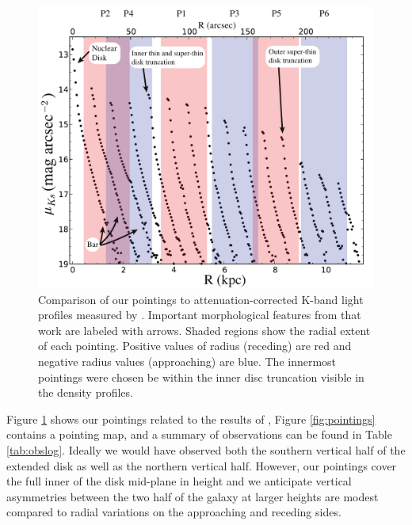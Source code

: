 \begin{figure}
  \centering
  \includegraphics[width=0.8\columnwidth]{891_1/figs/ASR_pointings.pdf}
  \caption[\GP pointings compared to known features in NGC
  891]{\label{fig:ASR_comp}\fixspacing Comparison of our \GP pointings
    to attenuation-corrected K-band light profiles measured by
    \citet{Schechtman-Rook13}. Important morphological features from
    that work are labeled with arrows. Shaded regions show the radial
    extent of each \GP pointing. Positive values of radius (receding)
    are red and negative radius values (approaching) are blue. The
    innermost \GP pointings were chosen be within the inner disc
    truncation visible in the density profiles.}
\end{figure}

Figure \ref{fig:ASR_comp} shows our \GP pointings related to the
results of \citet{Schechtman-Rook13}, Figure \ref{fig:pointings}
contains a pointing map, and a summary of observations can be found in
Table \ref{tab:obslog}. Ideally we would have observed both the
southern vertical half of the extended disk as well as the northern
vertical half. However, our pointings cover the full inner
 of the disk mid-plane in height and we anticipate
vertical asymmetries between the two half of the galaxy at larger
heights are modest compared to radial variations on the approaching
and receding sides.

